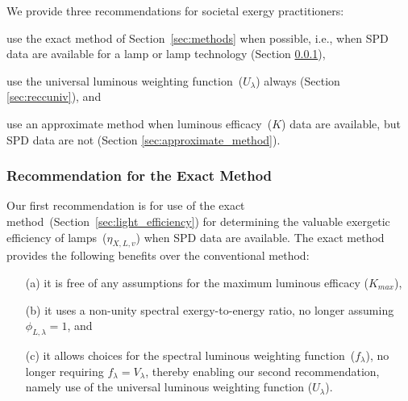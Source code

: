 \documentclass[energies,article,accept,moreauthors,pdftex]{Definitions/mdpi}\usepackage[]{graphicx}\usepackage[]{color}
\begin{document}
We provide three recommendations for societal exergy practitioners:
%
\begin{enumerate*}[label={(\alph*)}]

  \item use the exact method of Section~\ref{sec:methods} when possible, 
        i.e., when SPD data are available for a lamp or lamp technology
        (Section \ref{sec:recommend_exact_method}), 

  \item use the universal luminous weighting function~($U_\lambda$) always
           (Section \ref{sec:reccuniv}), and

  \item use an approximate method when luminous efficacy~($K$) data are available, but
        SPD data are not (Section \ref{sec:approximate_method}).

\end{enumerate*}


\subsubsection{Recommendation for the Exact Method} 
\label{sec:recommend_exact_method}

Our first recommendation is for use of the 
exact method~(Section~\ref{sec:light_efficiency})
for determining the valuable exergetic efficiency of lamps~($\eta_{X,L,v}$)
when SPD data are available.
The exact method provides the following benefits over the conventional method:
%
\begin{enumerate}[leftmargin=8mm,labelsep=3mm] 


  \item[(a)] it is free of any assumptions for the maximum luminous efficacy ($K_{max}$),

  \item[(b)] it uses a non-unity spectral exergy-to-energy ratio, no longer assuming $\phi_{L,\lambda} = 1$, and 

  \item[(c)] it allows choices for the spectral luminous weighting function~($f_\lambda$), 
        no longer requiring $f_\lambda = V_\lambda$, 
        thereby enabling our second recommendation, 
        namely use of the universal luminous weighting function ($U_\lambda$).

\end{enumerate}


\end{document}
